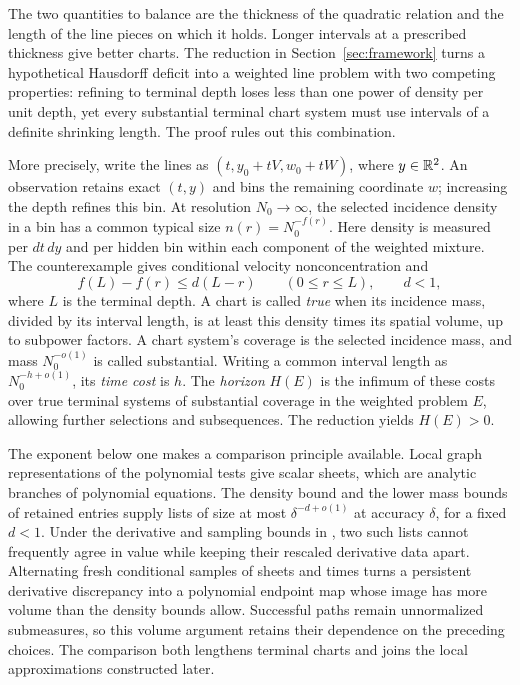 The two quantities to balance are the thickness of the quadratic
relation and the length of the line pieces on which it holds.
Longer intervals at a prescribed thickness give better charts.
The reduction in Section~\ref{sec:framework} turns a hypothetical
Hausdorff deficit into a weighted line problem with two competing
properties: refining to terminal depth loses less than one power of
density per unit depth, yet every substantial terminal chart system must use
intervals of a definite shrinking length. The proof rules out this
combination.

More precisely, write the lines as
\((t,y_0+tV,w_0+tW)\), where \(y\in\mathbb R^2\).
An observation retains exact \((t,y)\) and bins the remaining
coordinate \(w\); increasing the depth refines this bin.
At resolution \(N_0\to\infty\), the selected incidence density in a
bin has a common typical size \(n(r)=N_0^{-f(r)}\).
Here density is measured per \(dt\,dy\) and per hidden bin within
each component of the weighted mixture. The counterexample gives
conditional velocity nonconcentration and
\[
 f(L)-f(r)\le d(L-r)\qquad(0\le r\le L),\qquad d<1,
\]
where \(L\) is the terminal depth.
A chart is called \emph{true} when its incidence mass, divided by
its interval length, is at least this density times its spatial
volume, up to subpower factors.
A chart system's coverage is the selected incidence mass, and mass
\(N_0^{-o(1)}\) is called substantial.
Writing a common interval length as \(N_0^{-h+o(1)}\), its
\emph{time cost} is \(h\).
The \emph{horizon} \(H(E)\) is the infimum of these costs over true
terminal systems of substantial coverage in the weighted problem
\(E\), allowing further selections and subsequences.
The reduction yields \(H(E)>0\).

The exponent below one makes a comparison principle available.
Local graph representations of the polynomial tests give scalar
sheets, which are analytic branches of polynomial equations.
The density bound and the lower mass bounds of retained entries
supply lists of size at most \(\delta^{-d+o(1)}\) at accuracy
\(\delta\), for a fixed \(d<1\).
Under the derivative and sampling bounds in
, two such lists cannot frequently
agree in value while keeping their rescaled derivative data apart.
Alternating fresh conditional samples of sheets and times turns a
persistent derivative discrepancy into a polynomial endpoint map
whose image has more volume than the density bounds allow.
Successful paths remain unnormalized submeasures, so this volume
argument retains their dependence on the preceding choices.
The comparison both lengthens terminal charts and joins the local
approximations constructed later.

